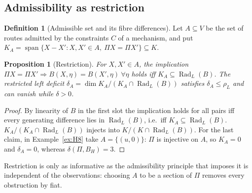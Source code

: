 \documentclass[11pt,a4paper]{article}
\newcommand{\Rad}{\operatorname{Rad}}
\newcommand{\spn}{\operatorname{span}}
\newcommand{\defic}{\delta}
\theoremstyle{plain}
\newtheorem{proposition}[theorem]{Proposition}
\theoremstyle{definition}
\newtheorem{definition}[theorem]{Definition}
\begin{document}
\subsection{Admissibility as restriction}
\begin{definition}[Admissible set and its fibre differences]
Let $A\subseteq V$ be the set of routes admitted by the constraints $C$ of a mechanism, and put $K_A=\spn\{X-X':X,X'\in A,\ \Pi X=\Pi X'\}\subseteq K$.
\end{definition}
\begin{proposition}[Restriction]\label{prop:fibre}
For $X,X'\in A$, the implication $\Pi X=\Pi X'\Rightarrow B(X,\eta)=B(X',\eta)\ \forall\eta$ holds iff $K_A\subseteq\Rad_L(B)$. The restricted left deficit $\defic_A=\dim K_A/(K_A\cap\Rad_L(B))$ satisfies $\defic_A\le\rho_L$ and can vanish while $\defic>0$.
\end{proposition}
\begin{proof}
By linearity of $B$ in the first slot the implication holds for all pairs iff every generating difference lies in $\Rad_L(B)$, i.e.\ iff $K_A\subseteq\Rad_L(B)$. $K_A/(K_A\cap\Rad_L(B))$ injects into $K/(K\cap\Rad_L(B))$. For the last claim, in Example~\ref{ex:H8} take $A=\{(u,0)\}$: $\Pi$ is injective on $A$, so $K_A=0$ and $\defic_A=0$, whereas $\defic(\Pi,B_H)=3$.
\end{proof}
Restriction is only as informative as the admissibility principle that imposes it is independent of the observations: choosing $A$ to be a section of $\Pi$ removes every obstruction by fiat.
\end{document}

